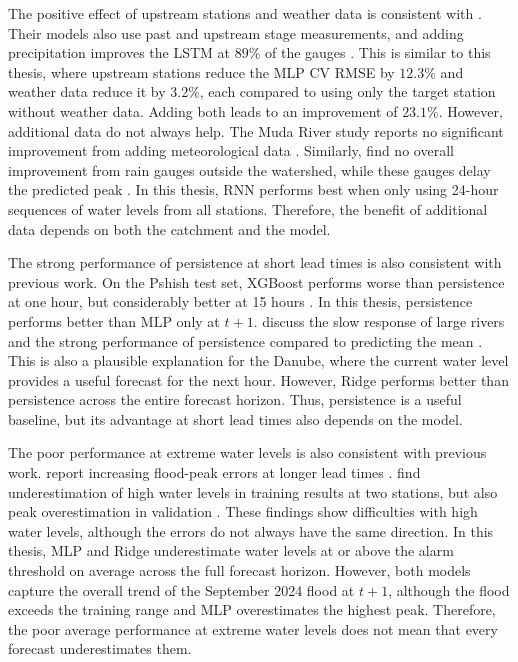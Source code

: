 The positive effect of upstream stations and weather data is consistent with \citeauthor{nevoFloodForecastingMachine2022}. Their models also use past and upstream stage measurements, and adding precipitation improves the \ac{LSTM} at $89\%$ of the gauges \cite{nevoFloodForecastingMachine2022}. This is similar to this thesis, where upstream stations reduce the \ac{MLP} \ac{CV} \ac{RMSE} by $12.3\%$ and weather data reduce it by $3.2\%$, each compared to using only the target station without weather data. Adding both leads to an improvement of $23.1\%$. However, additional data do not always help. The Muda River study reports no significant improvement from adding meteorological data \cite{zakariaExploringMachineLearning2023}. Similarly, \citeauthor{sandersDataDrivenFloodAlert2022} find no overall improvement from rain gauges outside the watershed, while these gauges delay the predicted peak \cite{sandersDataDrivenFloodAlert2022}. In this thesis, \ac{RNN} performs best when only using 24-hour sequences of water levels from all stations. Therefore, the benefit of additional data depends on both the catchment and the model.

The strong performance of persistence at short lead times is also consistent with previous work. On the Pshish test set, XGBoost performs worse than persistence at one hour, but considerably better at 15 hours \cite{belyakovaForecastingWaterLevels2022}. In this thesis, persistence performs better than \ac{MLP} only at $t+1$. \citeauthor{nevoFloodForecastingMachine2022} discuss the slow response of large rivers and the strong performance of persistence compared to predicting the mean \cite{nevoFloodForecastingMachine2022}. This is also a plausible explanation for the Danube, where the current water level provides a useful forecast for the next hour. However, Ridge performs better than persistence across the entire forecast horizon. Thus, persistence is a useful baseline, but its advantage at short lead times also depends on the model.

The poor performance at extreme water levels is also consistent with previous work. \citeauthor{dazziFloodStageForecasting2021} report increasing flood-peak errors at longer lead times \cite{dazziFloodStageForecasting2021}. \citeauthor{guoPredictionRiverStage2021} find underestimation of high water levels in training results at two stations, but also peak overestimation in validation \cite{guoPredictionRiverStage2021}. These findings show difficulties with high water levels, although the errors do not always have the same direction. In this thesis, \ac{MLP} and Ridge underestimate water levels at or above the alarm threshold on average across the full forecast horizon. However, both models capture the overall trend of the September 2024 flood at $t+1$, although the flood exceeds the training range and \ac{MLP} overestimates the highest peak. Therefore, the poor average performance at extreme water levels does not mean that every forecast underestimates them.

